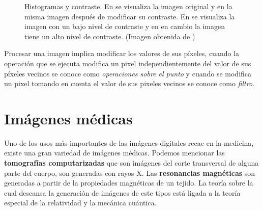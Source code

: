 \begin{figure}[h]
    \centering


    \bigskip


    \bigskip


  \caption[Histogramas y contraste]{Histogramas y contraste. En
  \protect{} se visualiza la imagen original y en
  \protect{} la misma imagen después de modificar su contraste. En
  \protect{} se visualiza la imagen con un bajo nivel de contraste
  y en \protect{} en cambio la imagen tiene un alto nivel de
  contraste. (Imagen obtenida de \cite{sipi})}
  \label{fig:histograms} 
\end{figure}

Procesar una imagen implica modificar los valores de sus píxeles, cuando la
operación que se ejecuta modifica un pixel independientemente del valor de sus
píxeles vecinos se conoce como \textit{operaciones sobre el punto} y cuando se
modifica un pixel tomando en cuenta el valor de sus pixeles vecinos se conoce
como \textit{filtro}.

\section{Imágenes médicas}

Uno de los usos más importantes de las imágenes digitales recae en la medicina,
existe una gran variedad de imágenes médicas. Podemos mencionar las
\textbf{tomografías computarizadas} que son imágenes del corte transversal de
alguna parte del cuerpo, son generadas con rayos X. Las \textbf{resonancias
magnéticas} son generadas a partir de la propiedades magnéticas de un tejido.
La teoría sobre la cual descansa la generación de imágenes de este tipos está
ligada a la teoría especial de la relatividad y la mecánica cuántica.

